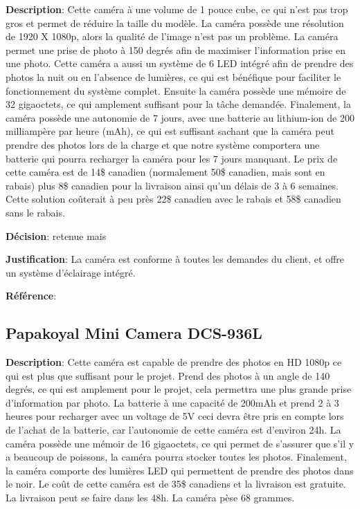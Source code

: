 	\textbf{Description}: Cette caméra à une volume de 1 pouce cube, ce qui n’est pas trop gros et permet de réduire la taille du modèle. La caméra possède une résolution de 1920 X 1080p, alors la qualité de l’image n’est pas un problème. La caméra permet une prise de photo à 150 degrés afin de maximiser l’information prise en une photo. Cette caméra a aussi un système de 6 LED intégré afin de prendre des photos la nuit ou en l'absence de lumières, ce qui est bénéfique pour faciliter le fonctionnement du système complet. Ensuite la caméra possède une mémoire de 32 gigaoctets, ce qui amplement suffisant pour la tâche demandée. Finalement, la caméra possède une autonomie de 7 jours, avec une batterie au lithium-ion de 200 milliampère par heure (mAh), ce qui est suffisant sachant que la caméra peut prendre des photos lors de la charge et que notre système comportera une batterie qui pourra recharger la caméra pour les 7 jours manquant. Le prix de cette caméra est de 14\$ canadien (normalement 50\$ canadien, mais sont en rabais) plus 8\$ canadien pour la livraison ainsi qu’un délais de 3 à 6 semaines. Cette solution coûterait à peu près 22\$ canadien avec le rabais et 58\$ canadien sans le rabais.
	
	\textbf{Décision}: retenue mais
	
	\textbf{Justification}: La caméra est conforme à toutes les demandes du client, et offre un système d’éclairage intégré.
	
	\textbf{Référence}: \cite{sok3254}
	
	\subsection{Papakoyal Mini Camera DCS-936L}

	
	\textbf{Description}: Cette caméra est capable de prendre des photos en HD 1080p ce qui est plus que suffisant pour le projet. Prend des photos à un angle de 140 degrés, ce qui est amplement pour le projet, cela permettra une plus grande prise d’information par photo. La batterie à une capacité de 200mAh et prend 2 à 3 heures pour recharger avec un voltage de 5V ceci devra être pris en compte lors de l’achat de la batterie, car l’autonomie de cette caméra est d’environ 24h. La caméra possède une mémoir de 16 gigaoctets, ce qui permet de s’assurer que s’il y a beaucoup de poissons, la caméra pourra stocker toutes les photos. Finalement, la caméra comporte des lumières LED qui permettent de prendre des photos dans le noir. Le coût de cette caméra est de 35\$ canadiens et la livraison est gratuite. La livraison peut se faire dans les 48h. La caméra pèse 68 grammes.


